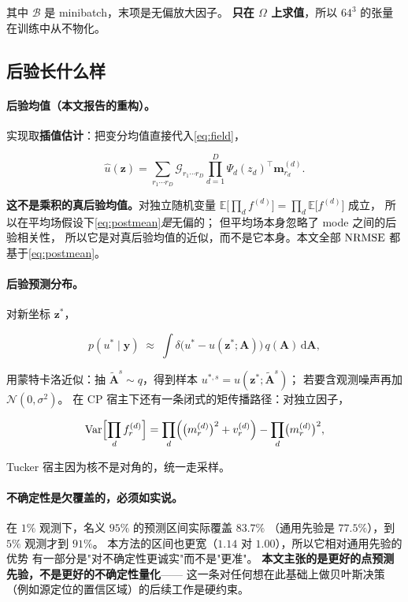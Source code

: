 \documentclass[11pt,a4paper]{article}
\begin{document}
其中 $\mathcal{B}$ 是 minibatch，末项是无偏放大因子。
\textbf{只在 $\Omega$ 上求值}，所以 $64^3$ 的张量在训练中从不物化。

\subsection{后验长什么样}

\paragraph{后验均值（本文报告的重构）。}
实现取\textbf{插值估计}：把变分均值直接代入\cref{eq:field}，

\begin{equation}
\hat{u}(\mathbf{z}) = \sum_{r_1 \cdots r_D} \mathcal{G}_{r_1\cdots r_D}
  \prod_{d=1}^{D} \Psi_d(z_d)^\top \mathbf{m}^{(d)}_{r_d}.
\label{eq:postmean}
\end{equation}

\textbf{这不是乘积的真后验均值。}对独立随机变量
$\mathbb{E}\bigl[\prod_d f^{(d)}\bigr] = \prod_d \mathbb{E}\bigl[f^{(d)}\bigr]$ 成立，
所以在平均场假设下\cref{eq:postmean}\emph{是}无偏的；
但平均场本身忽略了 mode 之间的后验相关性，
所以它是对真后验均值的近似，而不是它本身。本文全部 $\mathrm{NRMSE}$ 都基于\cref{eq:postmean}。

\paragraph{后验预测分布。}对新坐标 $\mathbf{z}^\ast$，

\begin{equation}
p(u^\ast \mid \mathbf{y}) \;\approx\; \int \delta\bigl(u^\ast - u(\mathbf{z}^\ast; \mathbf{A})\bigr)\, q(\mathbf{A})\, \mathrm{d}\mathbf{A},
\end{equation}

用蒙特卡洛近似：抽 $\tilde{\mathbf{A}}^{s} \sim q$，得到样本
$u^{\ast,s} = u(\mathbf{z}^\ast; \tilde{\mathbf{A}}^{s})$；
若要含观测噪声再加 $\mathcal{N}(0,\sigma^2)$。
在 CP 宿主下还有一条闭式的矩传播路径：对独立因子，

\begin{equation}
\operatorname{Var}\Bigl[\prod_d f^{(d)}_r\Bigr]
  = \prod_d \Bigl(\bigl(m_r^{(d)}\bigr)^2 + v_r^{(d)}\Bigr) - \prod_d \bigl(m_r^{(d)}\bigr)^2 ,
\end{equation}

Tucker 宿主因为核不是对角的，统一走采样。

\paragraph{不确定性是欠覆盖的，必须如实说。}
在 $1\%$ 观测下，名义 $95\%$ 的预测区间实际覆盖 $83.7\%$
（通用先验是 $77.5\%$），到 $5\%$ 观测才到 $91\%$。
本方法的区间也更宽（$1.14$ 对 $1.00$），所以它相对通用先验的优势
有一部分是"对不确定性更诚实"而不是"更准"。
\textbf{本文主张的是更好的点预测先验，不是更好的不确定性量化}——
这一条对任何想在此基础上做贝叶斯决策（例如源定位的置信区域）的后续工作是硬约束。
\end{document}
